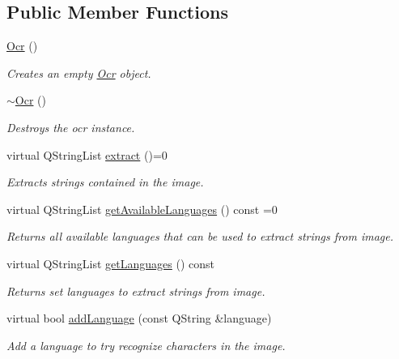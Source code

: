 \subsection*{Public Member Functions}
\begin{DoxyCompactItemize}
\item 
\mbox{\hyperlink{classOcr_a285da90c44b929a9883a461de3e6578d}{Ocr}} ()
\begin{DoxyCompactList}\small\item\em Creates an empty \mbox{\hyperlink{classOcr}{Ocr}} object. \end{DoxyCompactList}\item 
\mbox{\label{classOcr_a93ead91f7b64663ce6ed71ca4542d2f7}} 
\mbox{\hyperlink{classOcr_a93ead91f7b64663ce6ed71ca4542d2f7}{$\sim$\+Ocr}} ()
\begin{DoxyCompactList}\small\item\em Destroys the ocr instance. \end{DoxyCompactList}\item 
virtual Q\+String\+List \mbox{\hyperlink{classOcr_a09a27b3a1f579c41ebda05f2a2cf4fed}{extract}} ()=0
\begin{DoxyCompactList}\small\item\em Extracts strings contained in the image. \end{DoxyCompactList}\item 
virtual Q\+String\+List \mbox{\hyperlink{classOcr_a1b0eed20f8e7f553401834849d044bd2}{get\+Available\+Languages}} () const =0
\begin{DoxyCompactList}\small\item\em Returns all available languages that can be used to extract strings from image. \end{DoxyCompactList}\item 
virtual Q\+String\+List \mbox{\hyperlink{classOcr_abf98eb2648c41446700515c3e6ed3a24}{get\+Languages}} () const
\begin{DoxyCompactList}\small\item\em Returns set languages to extract strings from image. \end{DoxyCompactList}\item 
virtual bool \mbox{\hyperlink{classOcr_ad2fb764c1c6766233ebbb53e62064bb8}{add\+Language}} (const Q\+String \&language)
\begin{DoxyCompactList}\small\item\em Add a language to try recognize characters in the image. \end{DoxyCompactList}\item 

\end{DoxyCompactItemize}
